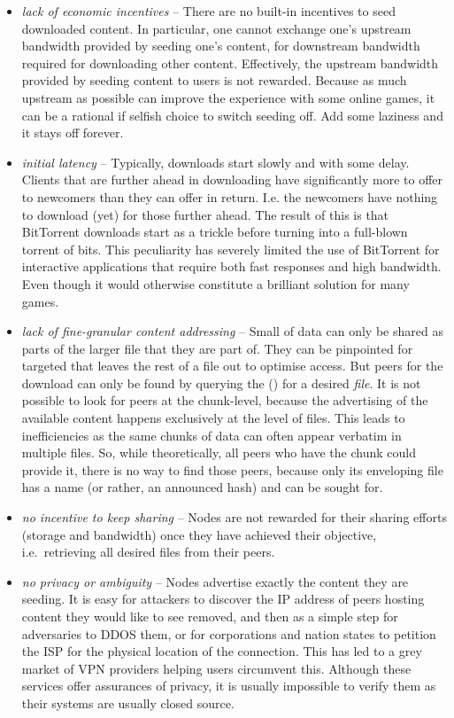 \begin{itemize}
\item \emph{lack of economic incentives} -- 
There are no built-in incentives to seed downloaded content. In particular, one cannot exchange one's upstream bandwidth provided by seeding one's content, for downstream bandwidth required for downloading other content. Effectively, the upstream bandwidth provided by seeding content to users is not rewarded. Because as much upstream as possible can improve the experience with some online games, it can be a rational if selfish choice to switch seeding off. Add some laziness and it stays off forever.

\item \emph{initial latency} -- 
 Typically, downloads start slowly and with some delay. Clients that are further ahead in downloading have significantly more to offer to newcomers than they can offer in return. I.e. the newcomers have nothing to download (yet) for those further ahead. The result of this is that BitTorrent downloads start as a trickle before turning into a full-blown torrent of bits. This peculiarity has severely limited the use of BitTorrent for interactive applications that require both fast responses and high bandwidth. Even though it would otherwise constitute a brilliant solution for many games.
 
\item \emph{lack of fine-granular content addressing} -- Small  of data can only be shared as parts of the larger file that they are part of. They can be pinpointed for targeted that leaves the rest of a file out to optimise access. But peers for the download can only be found by  querying the  () for a desired \emph{file}. It is not possible to look for peers at the chunk-level, because the advertising of the available content happens exclusively at the level of files. This leads to inefficiencies as the same chunks of data can often appear verbatim in multiple files. So, while theoretically, all peers who have the chunk could provide it, there is no way to find those peers, because only its enveloping file has a name (or rather, an announced hash) and can be sought for.

\item \emph{no incentive to keep sharing} --
Nodes are not rewarded for their sharing efforts (storage and bandwidth) once they have achieved their objective, i.e.\ retrieving all desired files from their peers.

\item \emph{no privacy or ambiguity} --
Nodes advertise exactly the content they are seeding. It is easy for attackers to discover the IP address of peers hosting content they would like to see removed, and then as a simple step for adversaries to DDOS them, or for corporations and nation states to petition the ISP for the physical location of the connection. This has led to a grey market of VPN providers helping users circumvent this. Although these services offer assurances of privacy, it is usually impossible to verify them as their systems  are usually closed source. 
\end{itemize}

